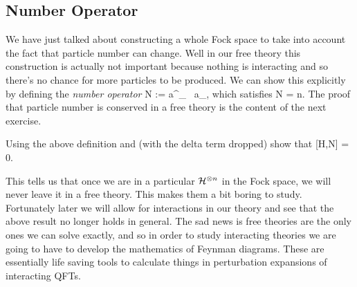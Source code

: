\subsection{Number Operator}

We have just talked about constructing a whole Fock space to take into account the fact that particle number can change. Well in our free theory this construction is actually not important because nothing is interacting and so there's no chance for more particles to be produced. We can show this explicitly by defining the \textit{number operator}
\be 
\label{eqn:NumberOperator}
    N := \int {} a^{\dagger}_{} \, a_{},
\ee 
which satisfies 
\bse 
    N = n.
\ese 
The proof that particle number is conserved in a free theory is the content of the next exercise. 

\bbox 
    Using the above definition and  (with the delta term dropped) show that 
    \be
    \label{eqn:NumberOperatorConserved}
        [H,N] = 0.
    \ee 
\ebox  

This tells us that once we are in a particular $\mathcal{H}^{\otimes n}$ in the Fock space, we will never leave it in a free theory. This makes them a bit boring to study. Fortunately later we will allow for interactions in our theory and see that the above result no longer holds in general. The sad news is free theories are the only ones we can solve exactly, and so in order to study interacting theories we are going to have to develop the mathematics of Feynman diagrams. These are essentially life saving tools to calculate things in perturbation expansions of interacting QFTs. 